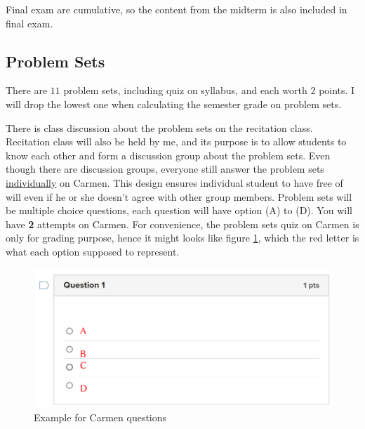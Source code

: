\documentclass[12pt]{article}
\begin{document}



Final exam are cumulative, so the content from the midterm is also included in final exam.

\subsection*{Problem Sets}
\label{sub:Problem_Sets}

There are $ 11 $ problem sets, including quiz on syllabus, and each worth $ 2 $ points. I will drop the lowest one when calculating the semester grade on problem sets.

There is class discussion about the problem sets on the recitation class.
Recitation class will also be held by me, and its purpose is to allow students to know each other and form a discussion group about the problem sets.
Even though there are discussion groups, everyone still answer the problem sets \underline{individually} on Carmen.
This design ensures individual student to have free of will even if he or she doesn't agree with other group members.
Problem sets will be multiple choice questions, each question will have option (A) to (D).
You will have \textbf{2} attempts on Carmen.
For convenience, the problem sets quiz on Carmen is only for grading purpose, hence it might looks like figure \ref{fig:Carmen}, which the red letter is what each option supposed to represent.

\begin{figure}
    \centering
    \caption{Example for Carmen questions}
    \label{fig:Carmen}
    \includegraphics[width=\textwidth]{./figures/Carmen_Q_Example.png}
\end{figure}
\end{document}
